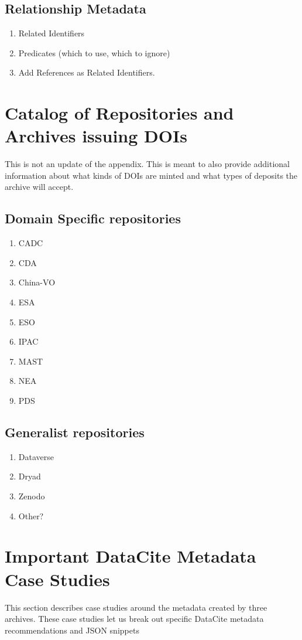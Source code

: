 \documentclass[11pt,a4paper]{ivoa}
\begin{document}
\subsection{Relationship Metadata}
\label{sec:bpmeta:related}
\begin{enumerate}
\item Related Identifiers 
\item Predicates (which to use, which to ignore)
\item Add References as Related Identifiers. 
\end{enumerate}


\appendix
\section{Catalog of Repositories and Archives issuing DOIs}
\label{sec:catalog}

This is not an update of the \citet{2022ApJS..260....5C} appendix. 
This is meant to also provide additional information about what kinds of DOIs are minted and what types of deposits the archive will accept.

\subsection{Domain Specific repositories}
\begin{enumerate}
\item CADC
\item CDA
\item China-VO
\item ESA
\item ESO
\item IPAC
\item MAST
\item NEA
\item PDS
\end{enumerate}

\subsection{Generalist repositories}
\begin{enumerate}
\item Dataverse
\item Dryad
\item Zenodo
\item Other?
\end{enumerate}


\section{Important DataCite Metadata Case Studies}
This section describes case studies around the metadata created by three archives. 
These case studies let us break out specific DataCite metadata recommendations and JSON snippets
\end{document}
